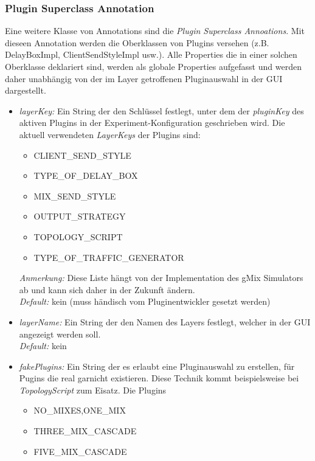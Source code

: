 \documentclass[a4paper, 11pt]{article} %
\begin{document}
\subsubsection{Plugin Superclass Annotation} %
\label{ssub:superclass_annotation}
Eine weitere Klasse von Annotations sind die \emph{Plugin Superclass Annoations}. 
Mit dieseen Annotation werden die Oberklassen von Plugins versehen (z.B. DelayBoxImpl, ClientSendStyleImpl usw.). Alle Properties die in einer solchen Oberklasse deklariert sind, werden als globale Properties aufgefasst und werden daher unabhängig von der im Layer getroffenen Pluginauswahl in der GUI dargestellt. 

\begin{itemize}
	\item \emph{layerKey:}
	Ein String der den Schlüssel festlegt, unter dem der \emph{pluginKey} des aktiven Plugins in der Experiment-Konfiguration geschrieben wird. Die aktuell verwendeten \emph{LayerKeys} der Plugins sind: 
	\begin{itemize}
		\item CLIENT\_SEND\_STYLE
		\item TYPE\_OF\_DELAY\_BOX
		\item MIX\_SEND\_STYLE
		\item OUTPUT\_STRATEGY
		\item TOPOLOGY\_SCRIPT 
		\item TYPE\_OF\_TRAFFIC\_GENERATOR
	\end{itemize}
	\emph{Anmerkung:} Diese Liste hängt von der Implementation des gMix Simulators ab und kann sich daher in der Zukunft ändern.\\
	\emph{Default:} kein (muss händisch vom Pluginentwickler gesetzt werden)
	\item \emph{layerName:}
	Ein String der den Namen des Layers festlegt, welcher in der GUI angezeigt werden soll.\\
	\emph{Default:} kein
	\item \emph{fakePlugins:}
	Ein String der es erlaubt eine Pluginauswahl zu erstellen, für Pugins die real garnicht existieren. Diese Technik kommt beispielsweise bei \emph{TopologyScript} zum Eisatz. Die Plugins  
	\begin{itemize} 
		\item NO\_MIXES,ONE\_MIX
		\item THREE\_MIX\_CASCADE 
		\item FIVE\_MIX\_CASCADE 
	\end{itemize}

\end{itemize}
\end{document}
